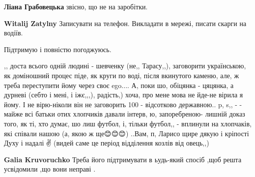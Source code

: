 \begin{itemize}
\begin{itemize}
\begin{itemize}
\textbf{Ліана Грабовецька} звісно, що не на заробітки.
\end{itemize}

 
\textbf{Witalij Zatylny} Записувати на телефон. Викладати в мережі, писати скарги на водіїв.

\end{itemize}

 
Підтримую і повністю погоджуюсь.

 

,, доста всього одній людині - шевченку (не,, Тарасу,,), заговорити
українською, як доміношний процес піде, як круги по воді, після вкинутого
каменю, але, ж треба переступити йому через своє ego.... А, поки шо, обіцянка -
цяцянка, а дурневі (себто і мені, і іжє,,,), радість,) хоча, про мене мова не
йде-не вірила я йому. І не вірю-ніколи він не заговорить 100 - відсотково
державною.. p, s,, - - майже всі батьки отих хлопчиків давали інтерв, ю,
запоребреною- лишній доказ того, як ті, хто думає, шо лиш футбол, і, тільки
футбол,, - вплинули на хлопчаків, які співали нашою (а, якою ж ще😊😊😊) ..Вам,
п, Ларисо щире дякую і кріпості Духу і надалі🙏✌️ (видей саме це період
відділення козлів від овець,,)

\begin{itemize}
 
\textbf{Galia Kruvoruchko} Треба його підтримувати в ьудь-який спосіб ,щоб решта усвідомили ,що вони неправі .
\end{itemize}



\end{itemize}
